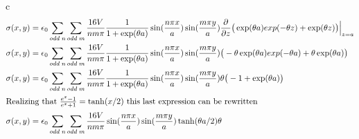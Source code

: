 \begin{homeworkProblem}
\begin{homeworkSection}{c}
\begin{align}
\sigma(x,y) &= \epsilon_0 \sum\limits_{odd\;n} \sum\limits_{odd\;m} \frac{16 V}{n m \pi} \frac{1}{1+\exp(\theta a)} \sin(\frac{n \pi x}{a}) \sin(\frac{m \pi y}{a}) \dfrac{\partial }{\partial z}\big(\exp(\theta a)exp(-\theta z) + \exp(\theta z)\big)\Big|_{z=a} \nonumber \\
\sigma(x,y) &= \epsilon_0 \sum\limits_{odd\;n} \sum\limits_{odd\;m} \frac{16 V}{n m \pi} \frac{1}{1+\exp(\theta a)} \sin(\frac{n \pi x}{a}) \sin(\frac{m \pi y}{a}) \big(-\theta \exp(\theta a)exp(-\theta a) + \theta \exp(\theta a)\big) \nonumber \\
\sigma(x,y) &= \epsilon_0 \sum\limits_{odd\;n} \sum\limits_{odd\;m} \frac{16 V}{n m \pi} \frac{1}{1+\exp(\theta a)} \sin(\frac{n \pi x}{a}) \sin(\frac{m \pi y}{a}) \theta\big(-1 + \exp(\theta a)\big) \nonumber \\
\intertext{Realizing that $\frac{e^x-1}{e^x+1} = \tanh(x/2)$ this last expression can be rewritten} \nonumber
\sigma(x,y) &= \epsilon_0 \sum\limits_{odd\;n} \sum\limits_{odd\;m} \frac{16 V}{n m \pi} \sin(\frac{n \pi x}{a}) \sin(\frac{m \pi y}{a})\tanh(\theta a/2) \theta \nonumber
\end{align}
\end{homeworkSection}

\end{homeworkProblem}
